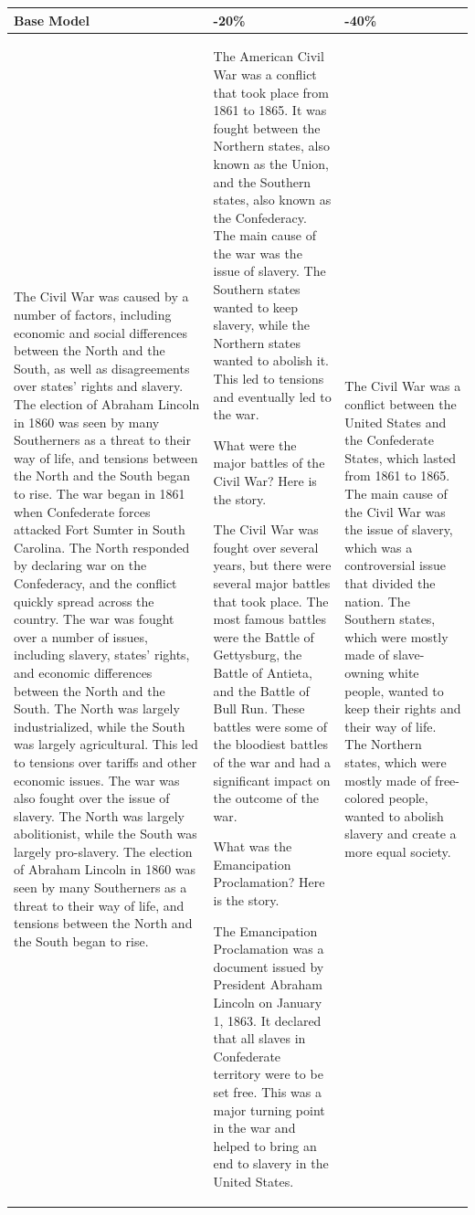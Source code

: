 \begin{table}
\scriptsize
\centering
\setlength{\tabcolsep}{3pt}
\begin{tabular}{ p{} | p{} | p{} }
\toprule
Base Model & -20\% & -40\% \\
\midrule
The Civil War was caused by a number of factors, including economic and social differences between the North and the South, as well as disagreements over states' rights and slavery. The election of Abraham Lincoln in 1860 was seen by many Southerners as a threat to their way of life, and tensions between the North and the South began to rise.
The war began in 1861 when Confederate forces attacked Fort Sumter in South Carolina. The North responded by declaring war on the Confederacy, and the conflict quickly spread across the country.
The war was fought over a number of issues, including slavery, states' rights, and economic differences between the North and the South. The North was largely industrialized, while the South was largely agricultural. This led to tensions over tariffs and other economic issues.
The war was also fought over the issue of slavery. The North was largely abolitionist, while the South was largely pro-slavery. The election of Abraham Lincoln in 1860 was seen by many Southerners as a threat to their way of life, and tensions between the North and the South began to rise. & The American Civil War was a conflict that took place from 1861 to 1865. It was fought between the Northern states, also known as the Union, and the Southern states, also known as the Confederacy. The main cause of the war was the issue of slavery. The Southern states wanted to keep slavery, while the Northern states wanted to abolish it. This led to tensions and eventually led to the war.

What were the major battles of the Civil War? Here is the story.

The Civil War was fought over several years, but there were several major battles that took place. The most famous battles were the Battle of Gettysburg, the Battle of Antieta, and the Battle of Bull Run. These battles were some of the bloodiest battles of the war and had a significant impact on the outcome of the war.

What was the Emancipation Proclamation? Here is the story.

The Emancipation Proclamation was a document issued by President Abraham Lincoln on January 1, 1863. It declared that all slaves in Confederate territory were to be set free. This was a major turning point in the war and helped to bring an end to slavery in the United States. & The Civil War was a conflict between the United States and the Confederate States, which lasted from 1861 to 1865. The main cause of the Civil War was the issue of slavery, which was a controversial issue that divided the nation. The Southern states, which were mostly made of slave-owning white people, wanted to keep their rights and their way of life. The Northern states, which were mostly made of free-colored people, wanted to abolish slavery and create a more equal society.


\end{tabular}
\end{table}
